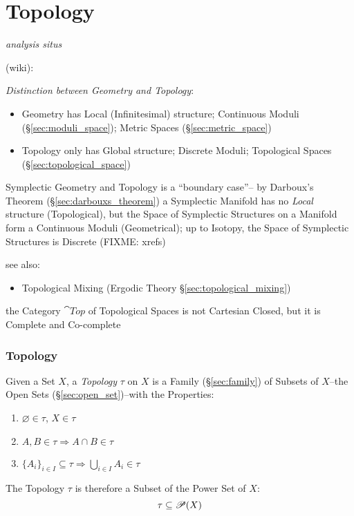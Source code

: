 \part{Topology}\label{part:topology}\cite{lc11}

\emph{analysis situs}

(wiki):

\emph{Distinction between Geometry and Topology}:
\begin{itemize}
\item Geometry has Local (Infinitesimal) structure; Continuous Moduli
  (\S\ref{sec:moduli_space}); Metric Spaces (\S\ref{sec:metric_space})
\item Topology only has Global structure; Discrete Moduli; Topological Spaces
  (\S\ref{sec:topological_space})
\end{itemize}

Symplectic Geometry and Topology is a ``boundary case''-- by Darboux's Theorem
(\S\ref{sec:darbouxs_theorem}) a Symplectic Manifold has no \emph{Local}
structure (Topological), but the Space of Symplectic Structures on a Manifold
form a Continuous Moduli (Geometrical); up to Isotopy, the Space of Symplectic
Structures is Discrete (FIXME: xrefs)

see also:
\begin{itemize}
  \item Topological Mixing (Ergodic Theory \S\ref{sec:topological_mixing})
\end{itemize}

the Category $\cat{Top}$ of Topological Spaces is not Cartesian Closed, but it
is Complete and Co-complete



\section{Topology}\label{sec:topology}

Given a Set $X$, a \emph{Topology} $\tau$ on $X$ is a Family
(\S\ref{sec:family}) of Subsets of $X$--the Open Sets
(\S\ref{sec:open_set})--with the Properties:
\begin{enumerate}
  \item $\varnothing \in \tau$, $X \in \tau$
  \item $A,B \in \tau \Rightarrow A \cap B \in \tau$
  \item $\{A_i\}_{i \in I} \subseteq \tau \Rightarrow \bigcup_{i \in
  I} A_i \in \tau$
\end{enumerate}
The Topology $\tau$ is therefore a Subset of the Power Set of $X$:
\[
  \tau \subseteq \mathscr{P}(X)
\]

